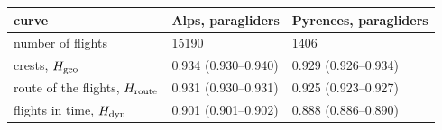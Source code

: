 \begin{tabular}{lll}
\toprule
curve & Alps, paragliders & Pyrenees, paragliders \\
\midrule
number of flights & 15190 & 1406 \\
crests, $H_{\mathrm{geo}}$ & 0.934 (0.930--0.940) & 0.929 (0.926--0.934) \\
route of the flights, $H_{\mathrm{route}}$ & 0.931 (0.930--0.931) & 0.925 (0.923--0.927) \\
flights in time, $H_{\mathrm{dyn}}$ & 0.901 (0.901--0.902) & 0.888 (0.886--0.890) \\
\bottomrule
\end{tabular}
